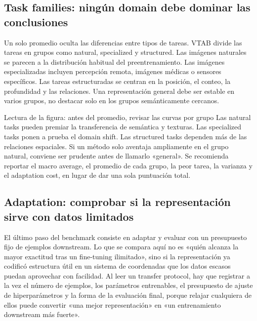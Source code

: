\subsection{Task families: ningún domain debe dominar las conclusiones}

Un solo promedio oculta las diferencias entre tipos de tareas. VTAB divide las tareas en grupos como natural, specialized y structured. Las imágenes naturales se parecen a la distribución habitual del preentrenamiento. Las imágenes especializadas incluyen percepción remota, imágenes médicas o sensores específicos. Las tareas estructuradas se centran en la posición, el conteo, la profundidad y las relaciones. Una representación general debe ser estable en varios grupos, no destacar solo en los grupos semánticamente cercanos.


\begin{knowledgebox}{Lectura de la figura: antes del promedio, revisar las curvas por grupo}
Las natural tasks pueden premiar la transferencia de semántica y texturas. Las specialized tasks ponen a prueba el domain shift. Las structured tasks dependen más de las relaciones espaciales. Si un método solo aventaja ampliamente en el grupo natural, conviene ser prudente antes de llamarlo «general». Se recomienda reportar el macro average, el promedio de cada grupo, la peor tarea, la varianza y el adaptation cost, en lugar de dar una sola puntuación total.
\end{knowledgebox}

\subsection{Adaptation: comprobar si la representación sirve con datos limitados}

El último paso del benchmark consiste en adaptar y evaluar con un presupuesto fijo de ejemplos downstream. Lo que se compara aquí no es «quién alcanza la mayor exactitud tras un fine-tuning ilimitado», sino si la representación ya codificó estructura útil en un sistema de coordenadas que los datos escasos puedan aprovechar con facilidad. Al leer un transfer protocol, hay que registrar a la vez el número de ejemplos, los parámetros entrenables, el presupuesto de ajuste de hiperparámetros y la forma de la evaluación final, porque relajar cualquiera de ellos puede convertir «una mejor representación» en «un entrenamiento downstream más fuerte».

